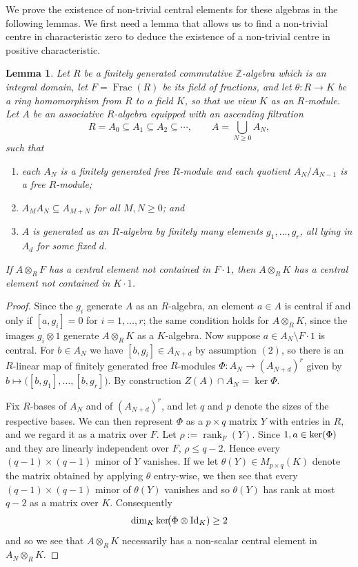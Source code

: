 \documentclass[a4paper,11pt,twoside,notitlepage,reqno]{amsart}
\theoremstyle{plain}
\numberwithin{thm}{section}
\newtheorem{lemma}[thm]{Lemma}
\theoremstyle{definition}
\begin{document}
We prove the existence of non-trivial central elements for these algebras in the following lemmas.  We first need a lemma that allows us to find a non-trivial centre in characteristic zero to deduce the existence of a non-trivial centre in positive characteristic.
\begin{lemma}\label{lem:lift}
Let $R$ be a finitely generated commutative $\mathbb{Z}$-algebra which is an integral domain,
let $F=\operatorname{Frac}(R)$ be its field of fractions, and let $\theta: R\to K$ be a ring homomorphism from $R$ to a field $K$, so that we view $K$ as an $R$-module.  Let $A$ be an associative
$R$-algebra equipped with an ascending filtration
$$R=A_0\subseteq A_1\subseteq A_2\subseteq\cdots,\qquad A=\bigcup_{N\ge 0}A_N,$$
such that
\begin{enumerate}
\item each $A_N$ is a finitely generated free $R$-module and each quotient
      $A_N/A_{N-1}$ is a free $R$-module;
\item $A_M A_N\subseteq A_{M+N}$ for all $M,N\ge 0$; and
\item $A$ is generated as an $R$-algebra by finitely many elements
      $g_1,\dots,g_r$, all lying in $A_d$ for some fixed $d$.
\end{enumerate}
If $A\otimes_R F$ has  a central element not contained in $F\cdot 1$, then $A\otimes_R K$ has  a central element not contained in $K\cdot 1$.
\end{lemma}

\begin{proof}
Since the $g_i$ generate $A$ as an $R$-algebra, an element $a\in A$ is central if and only if
$[a,g_i]=0$ for $i=1,\dots,r$; the same condition holds for $A\otimes_R K$, since the
images $g_i\otimes 1$ generate $A\otimes_R K$ as a $K$-algebra.  Now suppose $a\in A_N\setminus F\cdot 1$ is central.  For $b\in A_N$ we have
$[b,g_i]\in A_{N+d}$ by assumption $(2)$, so there is an $R$-linear map of
finitely generated free $R$-modules
$\Phi\colon A_N\longrightarrow (A_{N+d})^{r}$ given by 
$b\mapsto\bigl([b,g_1],\dots,[b,g_r]\bigr)$.
By construction
$Z(A)\cap A_N=\ker\Phi$. 

Fix $R$-bases of $A_N$ and of $(A_{N+d})^{r}$, and let $q$ and $p$ denote the sizes of the respective bases. We can then represent $\Phi$ as a $p\times q$ matrix $Y$ with entries in $R$, and we regard it as a matrix over $F$.  Let
$\rho:=\operatorname{rank}_F(Y)$.  Since $1,a\in {\rm ker}(\Phi)$ and they are linearly independent over $F$, $\rho\le q-2$.  Hence every $(q-1)\times(q-1)$ minor
of $Y$ vanishes. If we let $\theta(Y)\in M_{p\times q}(K)$ denote the matrix obtained by applying $\theta$ entry-wise, we then see that every $(q-1)\times (q-1)$ minor of $\theta(Y)$ vanishes and so $\theta(Y)$ has rank at most $q-2$ as a matrix over $K$.
Consequently
$$\dim_K\ker\!\bigl(\Phi\otimes {\rm Id}_K)
   \ge 2$$
   and so we see that $A\otimes_R K$ necessarily has a non-scalar central element in $A_N\otimes_R K$. 

\end{proof}
\end{document}
